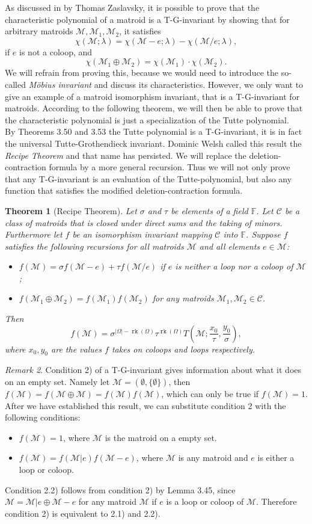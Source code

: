 \documentclass[12pt,a4paper, twoside, autooneside=false]{scrartcl}
\newtheorem{theorem}{Theorem}[section]
\theoremstyle{definition}
\theoremstyle{remark}
\newtheorem{remark}[theorem]{Remark}
\numberwithin{equation}{section}
\DeclareMathOperator{\rk}{\mathtt{rk}}
\newcommand{\M}{\mathcal{M}} %
\begin{document}
As discussed in \cite{Za1987} by Thomas Zaslavsky, it is possible to prove that the characteristic polynomial of a matroid is a T-G-invariant by showing that for arbitrary matroids $\M, \M_1, \M_2$, it satisfies 
\[
\chi(\M;\lambda) = \chi(\M - e;\lambda) - \chi(\M / e; \lambda),
\]
if $e$ is not a coloop, and 
\[
\chi(\M_1 \oplus \M_2) = \chi(\M_1) \cdot \chi(\M_2).
\] 
We will refrain from proving this, because we would need to introduce the so-called \textit{Möbius invariant} and discuss its characteristics. However, we only want to give an example of a matroid isomorphism invariant, that is a T-G-invariant for matroids. According to the following theorem, we will then be able to prove that the characteristic polynomial is just a specialization of the Tutte polynomial. \\
\indent By Theorems 3.50 and 3.53 the Tutte polynomial is a T-G-invariant, it is in fact the universal Tutte-Grothendieck invariant. Dominic Welsh \cite{We1999} called this result the \textit{Recipe Theorem} and that name has persisted. We will replace the deletion-contraction formula by a more general recursion. Thus we will not only prove that any T-G-invariant is an evaluation of the Tutte-polynomial, but also any function that satisfies the modified deletion-contraction formula.
\begin{theorem}[Recipe Theorem]
Let $\sigma$ and  $\tau$ be elements of a field $\mathbb{F}$. Let $\mathcal{C}$ be a class of matroids that is closed under direct sums and the taking of minors. Furthermore let $f$ be an isomorphism invariant mapping $\mathcal{C}$ into $\mathbb{F}$. Suppose $f$ satisfies the following recursions for all matroids $\M$ and all elements $e \in \M$:
\begin{itemize}
\item[1)] $f(\M) = \sigma f(\M - e) + \tau f(\M / e)$ if $e$ is neither a loop nor a coloop of $\M$; 
\item[2)] $f(\M_1 \oplus \M_2) = f(\M_1) f(\M_2)$ for any matroids $\M_1, \M_2 \in \mathcal{C}$.
\end{itemize}
Then
\[
f(\M) = \sigma^{|\Omega| - \rk(\Omega)}\tau^{\rk(\Omega)}T\left(\M;\frac{x_0}{\tau}, \frac{y_0}{\sigma}\right),
\]
where $x_0, y_0$ are the values $f$ takes on coloops and loops respectively. 
\end{theorem}
\begin{remark}
Condition 2) of a T-G-invariant gives information about what it does on an empty set. Namely let $\M = (\emptyset, \{\emptyset\})$, then $f(\M) = f(\M \oplus \M) = f(\M) f(\M)$, which can only be true if $f(\M) = 1$. After we have established this result, we can substitute condition 2 with the following conditions:
\begin{itemize}
\item[2.1)] $f(\M) = 1$, where $\M$ is the matroid on a empty set. 
\item[2.2)] $f(\M) = f(\M|e) f(\M - e)$, where $\M$ is any matroid and $e$ is either a loop or coloop.
\end{itemize}
Condition 2.2) follows from condition 2) by Lemma 3.45, since $\M = \M|e \oplus \M - e$ for any matroid $\M$ if $e$ is a loop or coloop of $\M$. Therefore condition 2) is equivalent to 2.1) and 2.2).
\end{remark}
\end{document}
